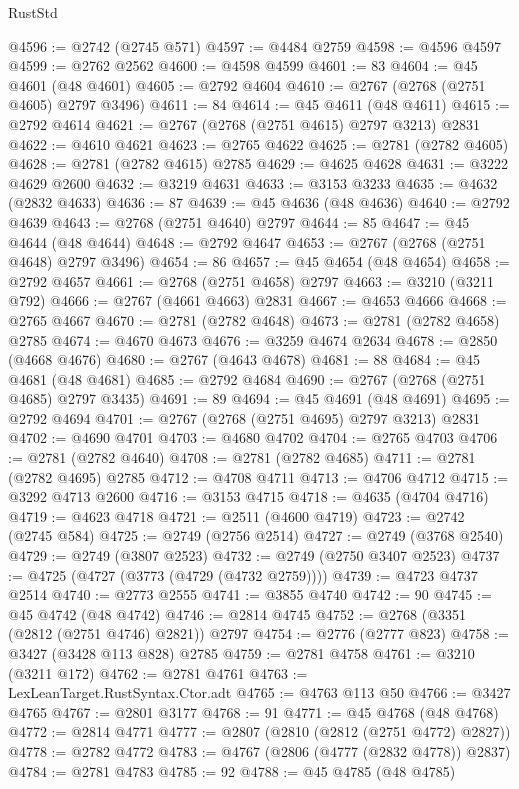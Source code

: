\begin{lexlean}{RustStd}
\begin{coremodule}
@4596 := @2742 (@2745 @571)
@4597 := @4484 @2759
@4598 := @4596 @4597
@4599 := @2762 @2562
@4600 := @4598 @4599
@4601 := 83
@4604 := @45 @4601 (@48 @4601)
@4605 := @2792 @4604
@4610 := @2767 (@2768 (@2751 @4605) @2797 @3496)
@4611 := 84
@4614 := @45 @4611 (@48 @4611)
@4615 := @2792 @4614
@4621 := @2767 (@2768 (@2751 @4615) @2797 @3213) @2831
@4622 := @4610 @4621
@4623 := @2765 @4622
@4625 := @2781 (@2782 @4605)
@4628 := @2781 (@2782 @4615) @2785
@4629 := @4625 @4628
@4631 := @3222 @4629 @2600
@4632 := @3219 @4631
@4633 := @3153 @3233
@4635 := @4632 (@2832 @4633)
@4636 := 87
@4639 := @45 @4636 (@48 @4636)
@4640 := @2792 @4639
@4643 := @2768 (@2751 @4640) @2797
@4644 := 85
@4647 := @45 @4644 (@48 @4644)
@4648 := @2792 @4647
@4653 := @2767 (@2768 (@2751 @4648) @2797 @3496)
@4654 := 86
@4657 := @45 @4654 (@48 @4654)
@4658 := @2792 @4657
@4661 := @2768 (@2751 @4658) @2797
@4663 := @3210 (@3211 @792)
@4666 := @2767 (@4661 @4663) @2831
@4667 := @4653 @4666
@4668 := @2765 @4667
@4670 := @2781 (@2782 @4648)
@4673 := @2781 (@2782 @4658) @2785
@4674 := @4670 @4673
@4676 := @3259 @4674 @2634
@4678 := @2850 (@4668 @4676)
@4680 := @2767 (@4643 @4678)
@4681 := 88
@4684 := @45 @4681 (@48 @4681)
@4685 := @2792 @4684
@4690 := @2767 (@2768 (@2751 @4685) @2797 @3435)
@4691 := 89
@4694 := @45 @4691 (@48 @4691)
@4695 := @2792 @4694
@4701 := @2767 (@2768 (@2751 @4695) @2797 @3213) @2831
@4702 := @4690 @4701
@4703 := @4680 @4702
@4704 := @2765 @4703
@4706 := @2781 (@2782 @4640)
@4708 := @2781 (@2782 @4685)
@4711 := @2781 (@2782 @4695) @2785
@4712 := @4708 @4711
@4713 := @4706 @4712
@4715 := @3292 @4713 @2600
@4716 := @3153 @4715
@4718 := @4635 (@4704 @4716)
@4719 := @4623 @4718
@4721 := @2511 (@4600 @4719)
@4723 := @2742 (@2745 @584)
@4725 := @2749 (@2756 @2514)
@4727 := @2749 (@3768 @2540)
@4729 := @2749 (@3807 @2523)
@4732 := @2749 (@2750 @3407 @2523)
@4737 := @4725 (@4727 (@3773 (@4729 (@4732 @2759))))
@4739 := @4723 @4737 @2514
@4740 := @2773 @2555
@4741 := @3855 @4740
@4742 := 90
@4745 := @45 @4742 (@48 @4742)
@4746 := @2814 @4745
@4752 := @2768 (@3351 (@2812 (@2751 @4746) @2821)) @2797
@4754 := @2776 (@2777 @823)
@4758 := @3427 (@3428 @113 @828) @2785
@4759 := @2781 @4758
@4761 := @3210 (@3211 @172)
@4762 := @2781 @4761
@4763 := LexLeanTarget.RustSyntax.Ctor.adt
@4765 := @4763 @113 @50
@4766 := @3427 @4765
@4767 := @2801 @3177
@4768 := 91
@4771 := @45 @4768 (@48 @4768)
@4772 := @2814 @4771
@4777 := @2807 (@2810 (@2812 (@2751 @4772) @2827))
@4778 := @2782 @4772
@4783 := @4767 (@2806 (@4777 (@2832 @4778)) @2837)
@4784 := @2781 @4783
@4785 := 92
@4788 := @45 @4785 (@48 @4785)

\end{coremodule}
\end{lexlean}
